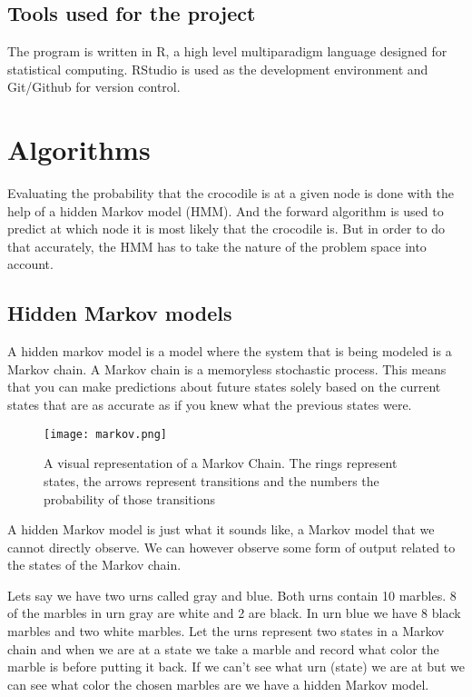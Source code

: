 \documentclass[12pt, a4paper]{article}
\begin{document}
\subsection{Tools used for the project}

The program is written in R, a high level multiparadigm language designed for statistical computing. RStudio is used as the development environment and Git/Github for version control. 

\section{Algorithms}

Evaluating the probability that the crocodile is at a given node is done with the help of a hidden Markov model (HMM). And the forward algorithm is used to predict at which node it is most likely that the crocodile is. But in order to do that accurately, the HMM has to take the nature of the problem space into account.

\subsection{Hidden Markov models}

A hidden markov model is a model where the system that is being modeled is a Markov chain. A Markov chain is a memoryless stochastic process. This means that you can make predictions about future states solely based on the current states that are as accurate as if you knew what the previous states were. %

\begin{figure}[!ht]
\centering
\texttt{[image: markov.png]}\\
\caption{A visual representation of a Markov Chain. The rings represent states, the arrows represent transitions and the numbers the probability of those transitions}
\label{mmp_mmd-box}
\end{figure}
\vspace{2.5mm}

A hidden Markov model is just what it sounds like, a Markov model that we cannot directly observe. We can however observe some form of output related to the states of the Markov chain. 

Lets say we have two urns called gray and blue. Both urns contain 10 marbles. 8 of the marbles in urn gray are white and 2 are black. In urn blue we have 8 black marbles and two white marbles. Let the urns represent two states in a Markov chain and when we are at a state we take a marble and record what color the marble is before putting it back. If we can't see what urn (state) we are at but we can see what color the chosen marbles are we have a hidden Markov model.%
\end{document}
